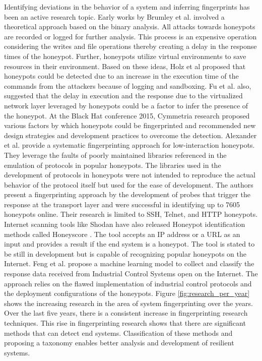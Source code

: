 Identifying deviations in the behavior of a system and inferring fingerprints has been an active research topic. Early works by Brumley et al. \cite{Brumley} involved a theoretical approach based on the binary analysis. All attacks towards honeypots are recorded or logged for further analysis. This process is an expensive operation considering the writes and file operations thereby creating a delay in the response times of the honeypot. Further, honeypots utilize virtual environments to save resources in their environment. Based on these ideas, Holz et al \cite{Holz} proposed that honeypots could be detected due to an increase in the execution time of the commands from the attackers because of logging and sandboxing. Fu et al. \cite{Fu} also, suggested that the delay in execution and the response due to the virtualized network layer leveraged by honeypots could be a factor to infer the presence of the honeypot. At the Black Hat conference 2015, Cymmetria research \cite{BLACKHAT} proposed various factors by which honeypots could be fingerprinted and recommended new design strategies and development practices to overcome the detection. Alexander et al. \cite{Vetterl2018} provide a systematic fingerprinting approach for low-interaction honeypots. They leverage the faults of poorly maintained libraries referenced in the emulation of protocols in popular honeypots. The libraries used in the development of protocols in honeypots were not intended to reproduce the actual behavior of the protocol itself but used for the ease of development. The authors present a fingerprinting approach by the development of probes that trigger the response at the transport layer and were successful in identifying up to 7605 honeypots online. Their research is limited to SSH, Telnet, and HTTP honeypots. Internet scanning tools like Shodan have also released Honeypot identification methods called Honeyscore \cite{SHODAN}. The tool accepts an IP address or a URL as an input and provides a result if the end system is a honeypot. The tool is stated to be still in development but is capable of recognizing popular honeypots on the Internet. Feng et al. \cite{Feng2016} propose a machine learning model to collect and classify the response data received from Industrial Control Systems open on the Internet. The approach relies on the flawed implementation of industrial control protocols and the deployment configurations of the honeypots. Figure \ref{fig:research_per_year} shows the increasing research in the area of system fingerprinting over the years. Over the last five years, there is a consistent increase in fingerprinting research techniques. This rise in fingerprinting research shows that there are significant methods that can detect end systems. Classification of these methods and proposing a taxonomy enables better analysis and development of resilient systems. 



